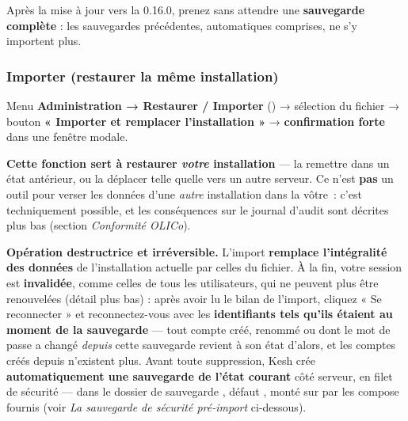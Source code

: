 \documentclass[a4paper,11pt,oneside]{article}
\begin{document}
\begin{keshwarning}
Après la mise à jour vers la 0.16.0, prenez sans attendre une \textbf{sauvegarde complète} : les sauvegardes précédentes, automatiques comprises, ne s'y importent plus.
\end{keshwarning}

\subsubsection{Importer (restaurer la même installation)}

Menu \textbf{Administration → Restaurer / Importer} () → sélection du fichier  → bouton \textbf{« Importer et remplacer l'installation »} → \textbf{confirmation forte} dans une fenêtre modale.

\textbf{Cette fonction sert à restaurer \emph{votre} installation} --- la remettre dans un état antérieur, ou la déplacer telle quelle vers un autre serveur. Ce n'est \textbf{pas} un outil pour verser les données d'une \emph{autre} installation dans la vôtre~: c'est techniquement possible, et les conséquences sur le journal d'audit sont décrites plus bas (section \emph{Conformité OLICo}).

\begin{keshwarning}
\textbf{Opération destructrice et irréversible.} L'import \textbf{remplace l'intégralité des données} de l'installation actuelle par celles du fichier. À la fin, votre session est \textbf{invalidée}, comme celles de tous les utilisateurs, qui ne peuvent plus être renouvelées (détail plus bas) : après avoir lu le bilan de l'import, cliquez « Se reconnecter » et reconnectez-vous avec les \textbf{identifiants tels qu'ils étaient au moment de la sauvegarde} --- tout compte créé, renommé ou dont le mot de passe a changé \emph{depuis} cette sauvegarde revient à son état d'alors, et les comptes créés depuis n'existent plus. Avant toute suppression, Kesh crée \textbf{automatiquement une sauvegarde de l'état courant} côté serveur, en filet de sécurité --- dans le dossier de sauvegarde , défaut , monté sur  par les compose fournis (voir \emph{La sauvegarde de sécurité pré-import} ci-dessous).
\end{keshwarning}
\end{document}
